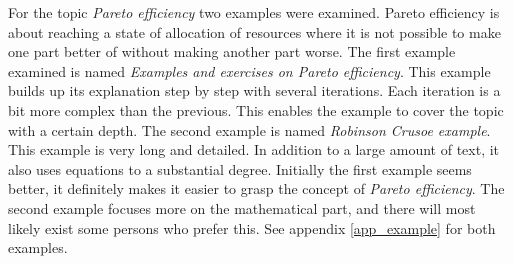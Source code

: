 For the topic \textit{Pareto efficiency} two examples were examined. Pareto efficiency is about reaching a state of allocation of resources where it is not possible to make one part better of without making another part worse. The first example examined is named \textit{Examples and exercises on Pareto efficiency}. This example builds up its explanation step by step with several iterations. Each iteration is a bit more complex than the previous. This enables the example to cover the topic with a certain depth. The second example is named \textit{Robinson Crusoe example}. This example is very long and detailed. In addition to a large amount of text, it also uses equations to a substantial degree. Initially the first example seems better, it definitely makes it easier to grasp the concept of \textit{Pareto efficiency}. The second example focuses more on the mathematical part, and there will most likely exist some persons who prefer this. See appendix \ref{app_example} for both examples.


\cleardoublepage